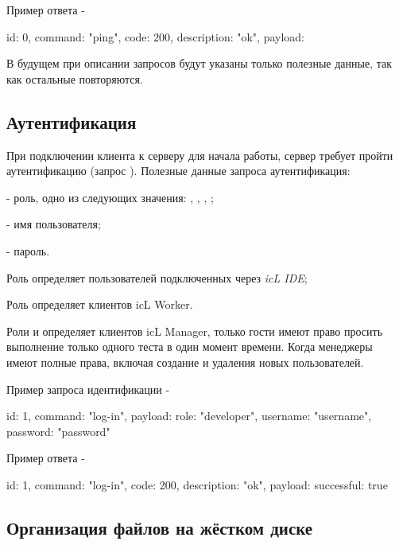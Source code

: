 Пример ответа -
\begin{jscode}
{
	id: 0,
	command: "ping",
	code: 200,
	description: "ok",
	payload: {}
}
\end{jscode}

В будущем при описании запросов будут указаны только полезные данные, так как остальные повторяются.

\subsection{Аутентификация}

При подключении клиента к серверу для начала работы, сервер требует пройти аутентификацию (запрос ). Полезные данные запроса аутентификация:
\begin{icItems}
	\item {} - роль, одно из следующих значения: , , , ;
	\item {} - имя пользователя;
	\item {} - пароль.
\end{icItems}

Роль  определяет пользователей подключенных через {\it icL IDE};

Роль  определяет клиентов icL Worker.

Роли  и  определяет клиентов icL Manager, только гости имеют право просить выполнение только одного теста в один момент времени. Когда менеджеры имеют полные права, включая создание и удаления новых пользователей.

Пример запроса идентификации -
\begin{jscode}
{
	id: 1,
	command: "log-in",
	payload: {
		role: "developer",
		username: "username",
		password: "password"
	}
}
\end{jscode}

Пример ответа -
\begin{jscode}
{
	id: 1,
	command: "log-in",
	code: 200,
	description: "ok",
	payload: { 
		successful: true 
	}
}
\end{jscode}

\subsection{Организация файлов на жёстком диске}

